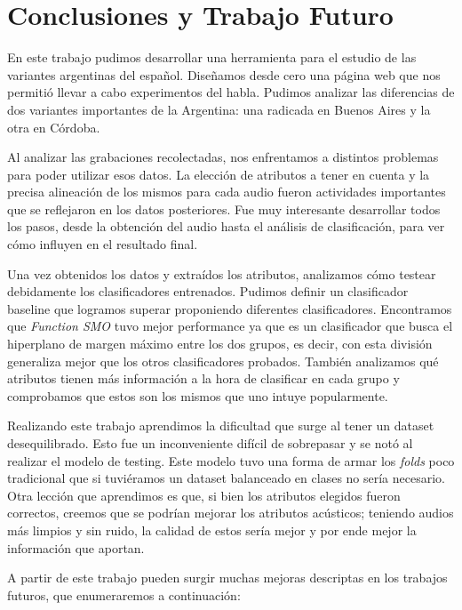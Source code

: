 \chapter{Conclusiones y Trabajo Futuro}

En este trabajo pudimos desarrollar una herramienta para el estudio de las variantes argentinas del español. Diseñamos desde cero una página web que nos permitió llevar a cabo experimentos del habla. Pudimos analizar las diferencias de dos variantes importantes de la Argentina: una radicada en Buenos Aires y la otra en Córdoba. 

Al analizar las grabaciones recolectadas, nos enfrentamos a distintos problemas para poder utilizar esos datos. La elección de atributos a tener en cuenta y la precisa alineación de los mismos para cada audio fueron actividades importantes que se reflejaron en los datos posteriores. Fue muy interesante desarrollar todos los pasos, desde la obtención del audio hasta el análisis de clasificación, para ver cómo influyen en el resultado final.

Una vez obtenidos los datos y extraídos los atributos, analizamos cómo testear debidamente los clasificadores entrenados. Pudimos definir un clasificador baseline que logramos superar proponiendo diferentes clasificadores. Encontramos que \textit{Function SMO} tuvo mejor performance ya que es un clasificador que busca el hiperplano de margen máximo entre los dos grupos, es decir, con esta división generaliza mejor que los otros clasificadores probados. También analizamos qué atributos tienen más información a la hora de clasificar en cada grupo y comprobamos que estos son los mismos que uno intuye popularmente.

Realizando este trabajo aprendimos la dificultad que surge al tener un dataset desequilibrado. Esto fue un inconveniente difícil de sobrepasar y se notó al realizar el modelo de testing. Este modelo tuvo una forma de armar los \textit{folds} poco tradicional que si tuviéramos un dataset balanceado en clases  no sería necesario. Otra lección que aprendimos es que, si bien los atributos elegidos fueron correctos, creemos que se podrían mejorar los atributos acústicos; teniendo audios más limpios y sin ruido, la calidad de estos sería mejor y por ende mejor la información que aportan. 

A partir de este trabajo pueden surgir muchas mejoras descriptas en los trabajos futuros, que enumeraremos a continuación:

